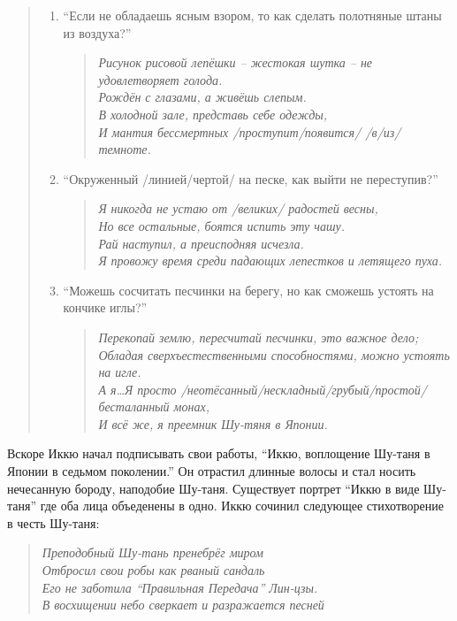 \begin{ver}
  \begin{quote}
    \begin{enumerate}
    \item 
      ``Если не обладаешь ясным взором, то как сделать полотняные
      штаны из воздуха?''
      \begin{verse}\it
        Рисунок рисовой лепёшки -- жестокая шутка -- не удовлетворяет
        голода.\\
        Рождён с глазами, а живёшь слепым.\\
        В холодной зале, представь себе одежды,\\
        И мантия бессмертных /проступит/появится/ /в/из/ темноте.
      \end{verse}

    \item
      ``Окруженный /линией/чертой/ на песке, как выйти не переступив?''
      \begin{verse}\it
        Я никогда не устаю от /великих/ радостей весны,\\
        Но все остальные, боятся испить эту чашу.\\
        Рай наступил, а преисподняя исчезла.\\
        Я провожу время среди падающих лепестков и летящего пуха.
      \end{verse}
      
    \item
      ``Можешь сосчитать песчинки на берегу, но как сможешь устоять на
      кончике иглы?''
      \begin{verse}\it
        Перекопай землю, пересчитай песчинки, это важное дело;\\
        Обладая сверхъестественными способностями, можно устоять на
        игле.\\
        А я\ldots Я просто /неотёсанный/нескладный/грубый/простой/
        бесталанный монах,\\
        И всё же, я преемник Шу-тяня в Японии. 
      \end{verse}
    \end{enumerate}
  \end{quote}
\end{ver}

\begin{ver}
  Вскоре Иккю начал подписывать свои работы, ``Иккю, воплощение
  Шу-таня в Японии в седьмом поколении.'' Он отрастил длинные волосы и
  стал носить нечесанную бороду, наподобие Шу-таня. Существует портрет
  ``Иккю в виде Шу-таня'' где оба лица объеденены в одно. Иккю сочинил
  следующее стихотворение в честь Шу-таня:
\end{ver}

\begin{ver}
  \begin{verse}\it
    Преподобный Шу-тань пренебрёг миром\\
    Отбросил свои робы как рваный сандаль\\
    Его не заботила ``Правильная Передача'' Лин-цзы.\\
    В восхищении небо сверкает и разражается песней
  \end{verse}
\end{ver}


